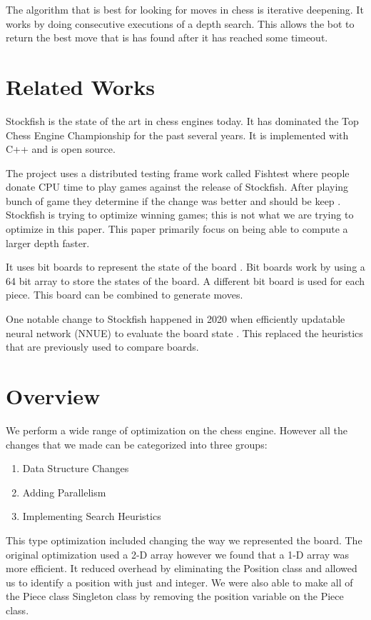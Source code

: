 \documentclass[sigconf]{acmart}
\begin{document}
The algorithm that is best for looking for moves in chess is iterative deepening.
It works by doing consecutive executions of a depth search.
This allows the bot to return the best move that is has found after it has reached some timeout.


\section{Related Works}
Stockfish \cite{stockfish} is the state of the art in chess engines today.
It has dominated the Top Chess Engine Championship for the past several years.
It is implemented with C++ and is open source.

The project uses a distributed testing frame work called Fishtest where people donate CPU time to play games against the release of Stockfish.
After playing bunch of game they determine if the change was better and should be keep \cite{stockwiki}.
Stockfish is trying to optimize winning games; this is not what we are trying to optimize in this paper.
This paper primarily focus on being able to compute a larger depth faster.

It uses bit boards to represent the state of the board \cite{stockwiki}.
Bit boards work by using a 64 bit array to store the states of the board.
A different bit board is used for each piece.
This board can be combined to generate moves.

One notable change to Stockfish happened in 2020 when efficiently updatable neural network (NNUE) to evaluate the board state \cite{chesswiki}.
This replaced the heuristics that are previously used to compare boards.





\section{Overview}
We perform a wide range of optimization on the chess engine.
However all the changes that we made can be categorized into three groups:
\begin{enumerate}
    \item Data Structure Changes
    \item Adding Parallelism
    \item Implementing Search Heuristics
\end{enumerate}

This type optimization included changing the way we represented the board.
The original optimization used a 2-D array however we found that a 1-D array was more efficient.
It reduced overhead by eliminating the Position class and allowed us to identify a position with just and integer.
We were also able to make all of the Piece class Singleton class by removing the position variable on the Piece class.
\end{document}
